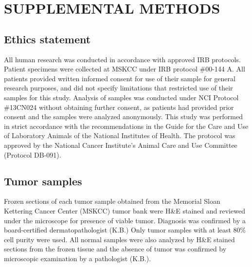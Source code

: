 \documentclass[10pt]{article}
\date{}
\begin{document}

\section*{SUPPLEMENTAL METHODS}

\subsection*{Ethics statement}

All human research was conducted in accordance with approved IRB protocols.
Patient specimens were collected at MSKCC under IRB protocol \#00-144 A.
All patients provided written informed consent for use of their sample for general research purposes, and did not specify limitations that restricted use of their samples for this study.
Analysis of samples was conducted under NCI Protocol \#13CN024 without obtaining further consent, as patients had provided prior consent and the samples were analyzed anonymously.
This study was performed in strict accordance with the recommendations in the Guide for the Care and Use of Laboratory Animals of the National Institutes of Health.
The protocol was approved by the National Cancer Institute's Animal Care and Use Committee (Protocol DB-091).

\subsection*{Tumor samples}
Frozen sections of each tumor sample obtained from the Memorial Sloan Kettering Cancer Center (MSKCC) tumor bank were H\&E stained and reviewed under the microscope for presence of viable tumor.
Diagnosis was confirmed by a board-certified dermatopathologist (K.B.) Only tumor samples with at least 80\% cell purity were used.
All normal samples were also analyzed by H\&E stained sections from the frozen tissue and the absence of tumor was confirmed by microscopic examination by a pathologist (K.B.).
\end{document}
